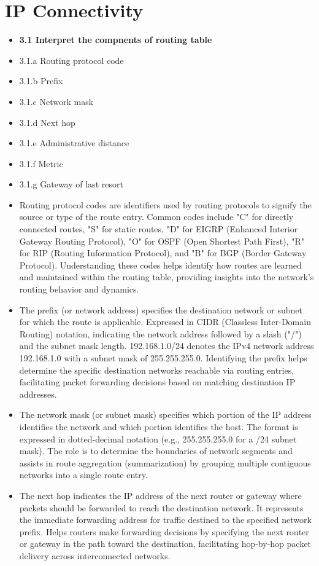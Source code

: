 \documentclass{article}
\begin{document}
\section{IP Connectivity}
\begin{itemize}
  \item \textbf{3.1 Interpret the compnents of routing table}
  \item 3.1.a Routing protocol code
  \item	3.1.b Prefix
  \item 3.1.c Network mask
  \item 3.1.d Next hop
  \item 3.1.e Administrative distance
  \item 3.1.f Metric
  \item 3.1.g Gateway of last resort
  	\item[] Routing protocol codes are identifiers used by routing protocols to signify the source or type of the route entry. Common codes include "C" for directly connected routes, "S" for static routes, "D" for EIGRP (Enhanced Interior Gateway Routing Protocol), "O" for OSPF (Open Shortest Path First), "R" for RIP (Routing Information Protocol), and "B" for BGP (Border Gateway Protocol). Understanding these codes helps identify how routes are learned and maintained within the routing table, providing insights into the network's routing behavior and dynamics.
	\item[] The prefix (or network address) specifies the destination network or subnet for which the route is applicable. Expressed in CIDR (Classless Inter-Domain Routing) notation, indicating the network address followed by a slash ("/") and the subnet mask length. 192.168.1.0/24 denotes the IPv4 network address 192.168.1.0 with a subnet mask of 255.255.255.0. Identifying the prefix helps determine the specific destination networks reachable via routing entries, facilitating packet forwarding decisions based on matching destination IP addresses.
	\item[] The network mask (or subnet mask) specifies which portion of the IP address identifies the network and which portion identifies the host. The format is expressed in dotted-decimal notation (e.g., 255.255.255.0 for a /24 subnet mask). The role is to determine the boundaries of network segments and assists in route aggregation (summarization) by grouping multiple contiguous networks into a single route entry.
	\item[] The next hop indicates the IP address of the next router or gateway where packets should be forwarded to reach the destination network. It represents the immediate forwarding address for traffic destined to the specified network prefix. Helps routers make forwarding decisions by specifying the next router or gateway in the path toward the destination, facilitating hop-by-hop packet delivery across interconnected networks.

\end{itemize}
\end{document}
